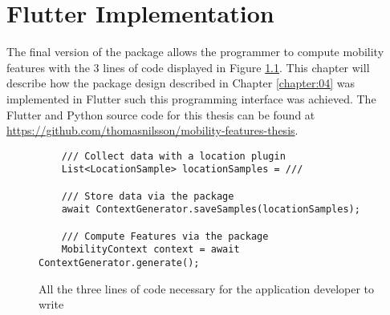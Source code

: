 \chapter{Flutter Implementation}
\label{chapter:05}
The final version of the package allows the programmer to compute mobility features with the 3 lines of code displayed in Figure \ref{fig:code-example-intro}. This chapter will describe how the package design described in Chapter \ref{chapter:04} was implemented in Flutter such this programming interface was achieved. The Flutter and Python source code for this thesis can be found at \url{https://github.com/thomasnilsson/mobility-features-thesis}.

\begin{figure}[h]
    \centering
    \begin{verbatim}
    /// Collect data with a location plugin
    List<LocationSample> locationSamples = ///

    /// Store data via the package
    await ContextGenerator.saveSamples(locationSamples);
    
    /// Compute Features via the package
    MobilityContext context = await ContextGenerator.generate();
    \end{verbatim}
    \caption{All the three lines of code necessary for the application developer to write}
    \label{fig:code-example-intro}
\end{figure}









